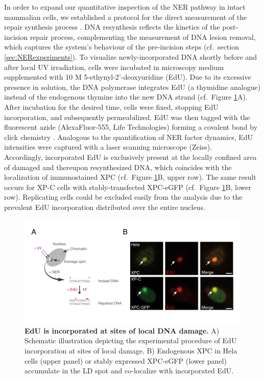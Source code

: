 In order to expand our quantitative inspection of the NER pathway in intact mammalian cells, we established a protocol for the direct measurement of the repair synthesis process \cite{Verbruggen2014}. DNA resynthesis reflects the kinetics of the post-incision repair process, complementing the measurement of DNA lesion removal, which captures the system's behaviour of the pre-incision steps (cf.\ section \ref{sec:NERexperiments}). To visualize newly-incorporated DNA shortly before and after local UV irradiation, cells were incubated in microscopy medium supplemented with 10 \textmu M 5-ethynyl-2'-deoxyuridine (EdU). Due to its excessive presence in solution, the DNA polymerase integrates EdU (a thymidine analogue) instead of the endogenous thymine into the new DNA strand (cf.\ Figure \ref{fig:EdU_measurement}A). After incubation for the desired time, cells were fixed, stopping EdU incorporation, and subsequently permeabilized. EdU was then tagged with the fluorescent azide (AlexaFluor-555, Life Technologies) forming a covalent bond by click chemistry \cite{Limsirichaikul2009}. Analogous to the quantification of NER factor dynamics, EdU intensities were captured with a laser scanning microscope (Zeiss).\\
Accordingly, incorporated EdU is exclusively present at the locally confined area of damaged and thereupon resynthesized DNA, which coincides with the localization of immunostained XPC (cf.\ Figure \ref{fig:EdU_measurement}B, upper row). The same result occurs for XP-C cells with stably-transfected XPC-eGFP (cf.\ Figure \ref{fig:EdU_measurement}B, lower row). Replicating cells could be excluded easily from the analysis due to the prevalent EdU incorporation distributed over the entire nucleus. 
  

    
 


\begin{figure}[htbp]
\begin{center}
\includegraphics[width=1\textwidth]{Abbildungen/figure2_3.pdf}
\caption{\textbf{EdU is incorporated at sites of local DNA damage.} A) Schematic illustration depicting the experimental procedure of EdU incorporation at sites of local damage. B) Endogenous XPC in Hela cells (upper panel) or stably expressed XPC-eGFP (lower panel) accumulate in the LD spot and co-localize with incorporated EdU.}
\label{fig:EdU_measurement}
\end{center}
\end{figure}


